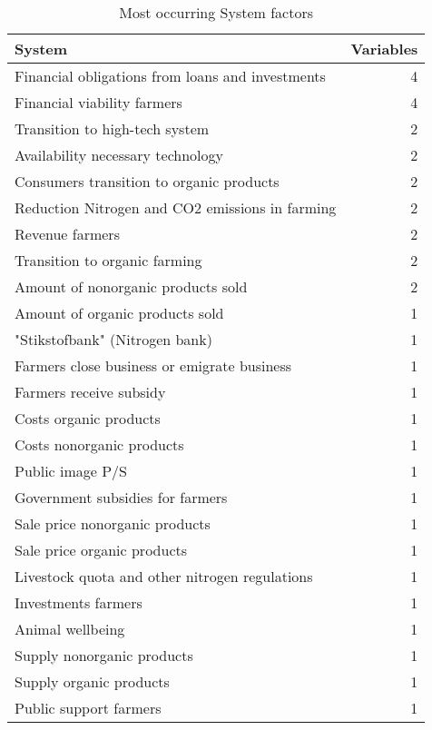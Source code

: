 
\begin{table}
\caption{Most occurring System factors}
\begin{tabular}{|l|r|}
\hline
System & Variables \\
\hline
Financial obligations from loans and investments & 4 \\
Financial viability farmers & 4 \\
Transition to high-tech system & 2 \\
Availability necessary technology & 2 \\
Consumers transition to organic products & 2 \\
Reduction Nitrogen and CO2 emissions in farming & 2 \\
Revenue farmers & 2 \\
Transition to organic farming & 2 \\
Amount of nonorganic products sold & 2 \\
Amount of organic products sold & 1 \\
"Stikstofbank" (Nitrogen bank) & 1 \\
Farmers close business or emigrate business & 1 \\
Farmers receive subsidy & 1 \\
Costs organic products & 1 \\
Costs nonorganic products & 1 \\
Public image P/S & 1 \\
Government subsidies for farmers & 1 \\
Sale price nonorganic products & 1 \\
Sale price organic products & 1 \\
Livestock quota and other nitrogen regulations & 1 \\
Investments farmers & 1 \\
Animal wellbeing & 1 \\
Supply nonorganic products & 1 \\
Supply organic products & 1 \\
Public support farmers & 1 \\
\hline
\end{tabular}
\end{table}

